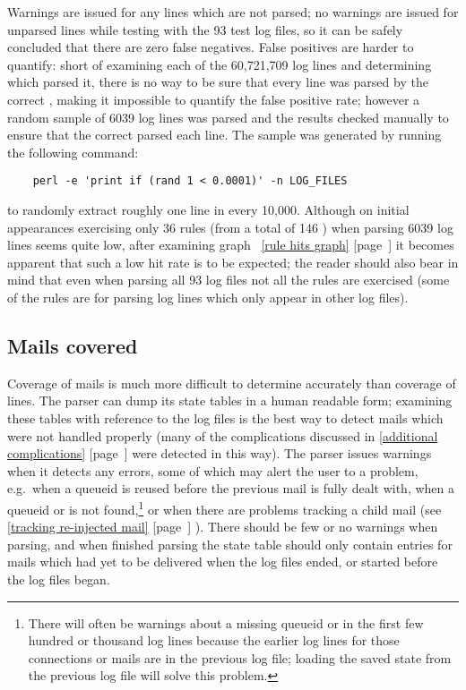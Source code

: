 \documentclass[a4paper,12pt,draft]{article}
\newcommand{\refwithpage}[1]{%
    \empty{}\ref{#1} [page~\pageref{#1}]%
}
\newcommand{\sectionref}[1]{%
    \textsection{}\refwithpage{#1}%
}
\newcommand{\numberOFlogFILES}[0]{%
    93%
}
\newcommand{\numberOFrules}[0]{%
    146%
}
\begin{document}
Warnings are issued for any lines which are not parsed; no warnings are
issued for unparsed lines while testing with the \numberOFlogFILES{} test
log files, so it can be safely concluded that there are zero false
negatives.  False positives are harder to quantify: short of examining each
of the 60,721,709 log lines and determining which \regex{} parsed it, there
is no way to be sure that every line was parsed by the correct \regex{},
making it impossible to quantify the false positive rate; however a random
sample of 6039 log lines was parsed and the results checked manually to
ensure that the correct \regex{} parsed each line.  The sample was
generated by running the following command:

\verb!    perl -e 'print if (rand 1 < 0.0001)' -n LOG_FILES!

\noindent{}to randomly extract roughly one line in every 10,000.  Although
on initial appearances exercising only 36 rules (from a total of
\numberOFrules{}) when parsing 6039 log lines seems quite low, after
examining graph~\refwithpage{rule hits graph} it becomes apparent that such
a low hit rate is to be expected; the reader should also bear in mind that
even when parsing all \numberOFlogFILES{} log files not all the rules are
exercised (some of the rules are for parsing log lines which only appear in
other log files).

\subsection{Mails covered}

\label{mails-covered}

Coverage of mails is much more difficult to determine accurately than
coverage of lines.  The parser can dump its state tables in a human
readable form; examining these tables with reference to the log files is
the best way to detect mails which were not handled properly (many of the
complications discussed in \sectionref{additional complications} were
detected in this way).  The parser issues warnings when it detects any
errors, some of which may alert the user to a problem, e.g.\ when a queueid
is reused before the previous mail is fully dealt with, when a queueid or
\pid{} is not found,\footnote{There will often be warnings about a missing
queueid or \pid{} in the first few hundred or thousand log lines because
the earlier log lines for those connections or mails are in the previous
log file; loading the saved state from the previous log file will solve
this problem.} or when there are problems tracking a child mail (see
\sectionref{tracking re-injected mail}).  There should be few or no
warnings when parsing, and when finished parsing the state table should
only contain entries for mails which had yet to be delivered when the log
files ended, or started before the log files began.
\end{document}
